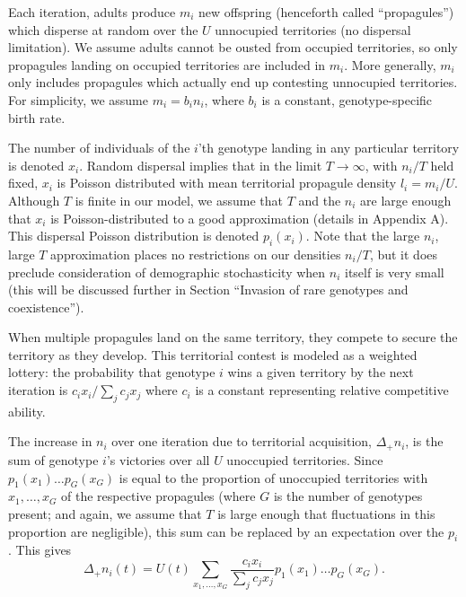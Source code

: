 \documentclass[11pt]{article}
\begin{document}
Each iteration, adults produce $m_i$ new offspring (henceforth called ``propagules'') which disperse at random over the $U$ unnocupied territories (no dispersal limitation). We assume adults cannot be ousted from occupied territories, so only propagules landing on occupied territories are included in $m_i$. More generally, $m_i$ only includes propagules which actually end up contesting unnocupied territories. For simplicity, we assume $m_i=b_i n_i$, where $b_i$ is a constant, genotype-specific birth rate. 

The number of individuals of the $i$'th genotype landing in any particular territory is denoted $x_i$. Random dispersal implies that in the limit $T\rightarrow \infty$, with $n_i/T$ held fixed, $x_i$ is Poisson distributed with mean territorial propagule density $l_i=m_i/U$. Although $T$ is finite in our model, we assume that $T$ and the $n_i$ are large enough that $x_i$ is Poisson-distributed to a good approximation (details in Appendix A). This dispersal Poisson distribution is denoted $p_i(x_i)$. Note that the large $n_i$, large $T$ approximation places no restrictions on our densities $n_i/T$, but it does preclude consideration of demographic stochasticity when $n_i$ itself is very small (this will be discussed further in Section ``Invasion of rare genotypes and coexistence'').

When multiple propagules land on the same territory, they compete to secure the territory as they develop. This territorial contest is modeled as a weighted lottery: the probability that genotype $i$ wins a given territory by the next iteration is $c_i x_i/\sum_j c_j x_j$ where $c_i$ is a constant representing relative competitive ability. 

The increase in $n_i$ over one iteration due to territorial acquisition, $\Delta_+ n_i$, is the sum of genotype $i$'s victories over all $U$ unoccupied territories. Since $p_1(x_1)\ldots p_G(x_G)$ is equal to the proportion of unoccupied territories with $x_1,\ldots,x_G$ of the respective propagules (where $G$ is the number of genotypes present; and again, we assume that $T$ is large enough that fluctuations in this proportion are negligible), this sum can be replaced by an expectation over the $p_i$. This gives
\begin{equation}
\Delta_+ n_i(t)=U(t)\sum_{x_1,\ldots,x_G} \frac{c_i x_i}{\sum_j c_j x_j} p_1(x_1)\ldots p_G(x_G). \label{eq:growthsumuncoupled}
\end{equation}
\end{document}
